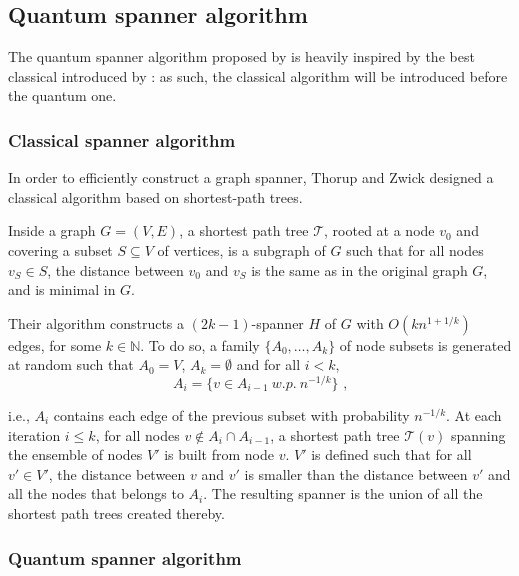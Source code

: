 \subsection{Quantum spanner algorithm}


The quantum spanner algorithm proposed by \citeauthor{apers_quantum_2019} is heavily inspired by the best classical introduced by \citeauthor{Thorup_Zwick_2005} \cite{Thorup_Zwick_2005}: as such, the classical algorithm will be introduced before the quantum one.

\subsubsection{Classical spanner algorithm}

In order to efficiently construct a graph spanner, Thorup and Zwick \cite{Thorup_Zwick_2005} designed a classical algorithm based on shortest-path trees.

\begin{definition}
Inside a graph $G=(V,E)$, a shortest path tree $\mathcal T$, rooted at a node $v_0$ and covering a subset $S\subseteq V$ of vertices,
is a subgraph of $G$ such that for all nodes $v_S \in S$, 
the distance between $v_0$ and $v_S$ is the same as in the original graph $G$, and is minimal in $G$.
\end{definition}

Their algorithm constructs a $(2k-1)$-spanner $H$ of $G$ with $O(k n^{1+1/k})$ edges, for some $k\in \mathbb{N}$. To do so, a family $\{A_0,\dots, A_k\}$ of node subsets is generated at random such that $A_0=V$, $A_k = \emptyset$ and for all 
$i<k$, 
\begin{equation}\label{eq:ai-spanner}
   A_i = \{v \in A_{i-1}\ w.p.\ n^{-1/k}\} \text{ ,} 
\end{equation}

i.e., $A_i$ contains each edge of the previous subset with probability $n^{-1/k}$.
At each iteration $i\leq k$, for all nodes $v \notin A_i \cap A_{i-1}$, a shortest
path tree $\mathcal T(v)$ spanning the ensemble of nodes $V'$ is built from node $v$. $V'$ is 
defined such that for all $v' \in V'$, the distance between $v$ and $v'$ is smaller
than the distance between $v'$ and all the nodes that belongs to $A_i$. The resulting spanner is
the union of all the shortest path trees created thereby. 

\subsubsection{Quantum spanner algorithm}

